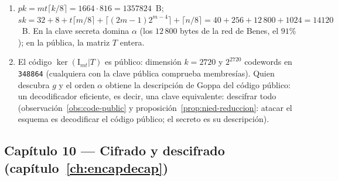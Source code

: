 \begin{enumerate}[leftmargin=1.9em,itemsep=4pt]
        matriz binaria aleatoria $mt\times n$ sean independientes es
        $\prod_{i=0}^{mt-1}(1-2^{i-mt})
        =\prod_{j=1}^{mt}(1-2^{-j})\approx0{,}289$:
        $3{,}46$ intentos de media, y $P(\ge3)\approx(1-0{,}289)^2
        \approx0{,}5055$. Con $(\mu,\nu)=(32,64)$ el fallo por
        intento cae bajo $2^{-30}$: un solo intento en la práctica,
        a cambio de $\le2$ bits de tensión en la reducción y una
        ventana de intercambios de tamaño fijo (tiempo constante).
  \item $pk=mt\lceil k/8\rceil=1664\cdot816=\num{1357824}$~B;
        $sk=32+8+t\lceil m/8\rceil+\lceil(2m-1)2^{m-4}\rceil
        +\lceil n/8\rceil=40+256+12\,800+1024=\num{14120}$~B.
        En la clave secreta domina $\alpha$ (los $12\,800$ bytes de
        la red de Benes, el $91\%$); en la pública, la matriz $T$
        entera.
  \item El código $\ker(\mathrm{I}_{mt}|T)$ es público: dimensión
        $k=2720$ y $2^{2720}$ codewords en \texttt{348864}
        (cualquiera con la clave pública comprueba membresías). Quien
        descubra $g$ y el orden $\alpha$ obtiene la descripción de
        Goppa del código público: un decodificador eficiente, es
        decir, una clave equivalente: descifrar todo
        (observación~\ref{obs:code-public} y
        proposición~\ref{prop:nied-reduccion}: atacar el esquema es
        decodificar el código público; el secreto es su
        descripción).
\end{enumerate}

\subsection*{Capítulo 10 --- Cifrado y descifrado
(capítulo~\ref{ch:encapdecap})}

